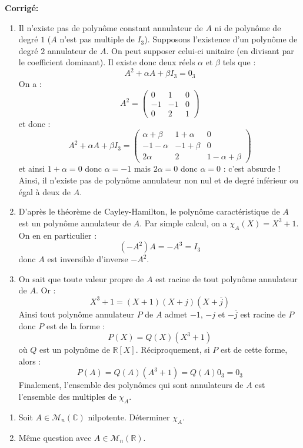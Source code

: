 \documentclass[a4paper,twoside,french,10pt]{VcCours}
\newcommand{\corr}{\textbf{Corrigé:}}
\begin{document}
\corr \begin{enumerate}
\item Il n'existe pas de polynôme constant annulateur de $A$ ni de polynôme de degré $1$ ($A$ n'est pas multiple de $I_3$). Supposons l'existence d'un polynôme de degré $2$ annulateur de $A$. On peut supposer celui-ci unitaire (en divisant par le coefficient dominant). Il existe donc deux réels $\alpha$ et $\beta$ tels que :
$$ A^2 + \alpha A + \beta I_3 = 0_3$$
On a :
$$ A^2 = \begin{pmatrix}
0 & 1 & 0 \\
-1 & -1 & 0 \\
0 & 2 & 1 
\end{pmatrix}$$
et donc :
$$ A^2+ \alpha A + \beta I_3 = \begin{pmatrix}
\alpha+ \beta & 1+ \alpha & 0 \\
-1- \alpha & -1+ \beta & 0 \\
2 \alpha & 2 & 1  - \alpha + \beta
\end{pmatrix}$$
et ainsi $1+ \alpha = 0$ donc $\alpha =-1$ mais $2 \alpha = 0$ donc $\alpha = 0$ : c'est absurde ! Ainsi, il n'existe pas de polynôme annulateur non nul et de degré inférieur ou égal à deux de $A$.
\item D'après le théorème de Cayley-Hamilton, le polynôme caractéristique de $A$ est un polynôme annulateur de $A$. Par simple calcul, on a $\chi_A(X) = X^3+1$. On en en particulier :
$$ (-A^2)A= -A^3 = I_3$$
donc $A$ est inversible d'inverse $-A^2$.
\item On sait que toute valeur propre de $A$ est racine de tout polynôme annulateur de $A$. Or :
$$ X^3+1 = (X+1) (X+j)(X+ \overline{j})$$
Ainsi tout polynôme annulateur $P$ de $A$ admet $-1$, $-j$ et $- \overline{j}$ est racine de $P$ donc $P$ est de la forme :
$$ P(X)= Q(X) (X^3+1)$$
où $Q$ est un polynôme de $\mathbb{R}[X]$. Réciproquement, si $P$ est de cette forme, alors :
$$ P(A) = Q(A)(A^3+1) = Q(A) 0_3 = 0_3$$
Finalement, l'ensemble des polynômes qui sont annulateurs de $A$ est l'ensemble des multiples de $\chi_A$.
\end{enumerate}

\begin{Exercice}{}
  \begin{enumerate}
  \item  Soit $A \in \mathcal{M}_{n}(\mathbb{C})$ nilpotente. Déterminer $\chi_{A}$.
  \item Même question avec $A \in \mathcal{M}_{n}(\mathbb{R})$.
  \end{enumerate}
\end{Exercice} 
\end{document}
